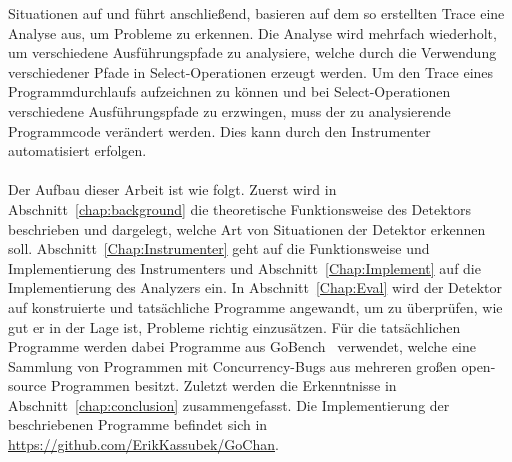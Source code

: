 Situationen auf und führt anschließend, basieren auf dem so erstellten Trace 
eine Analyse aus, um Probleme zu erkennen. Die Analyse wird mehrfach wiederholt, 
um verschiedene Ausführungspfade zu analysiere, welche durch die Verwendung 
verschiedener Pfade in Select-Operationen erzeugt werden. Um den Trace eines 
Programmdurchlaufs aufzeichnen zu können und bei Select-Operationen verschiedene 
Ausführungspfade zu erzwingen, muss der zu analysierende Programmcode 
verändert werden. Dies kann durch den Instrumenter automatisiert erfolgen.\\\\
Der Aufbau dieser Arbeit ist wie folgt. Zuerst wird in Abschnitt~\ref{chap:background}
die theoretische Funktionsweise des Detektors beschrieben und dargelegt, 
welche Art von Situationen der Detektor erkennen soll. 
Abschnitt~\ref{Chap:Instrumenter} geht auf die Funktionsweise und Implementierung 
des Instrumenters und Abschnitt~\ref{Chap:Implement} auf die Implementierung 
des Analyzers ein. In Abschnitt~\ref{Chap:Eval} wird der Detektor auf 
konstruierte und tatsächliche Programme angewandt, um zu überprüfen, 
wie gut er in der Lage ist, Probleme richtig einzusätzen. Für die 
tatsächlichen Programme werden dabei Programme aus GoBench~\cite{gobench}
verwendet, welche eine Sammlung von Programmen mit Concurrency-Bugs aus 
mehreren großen open-source Programmen besitzt. Zuletzt werden die 
Erkenntnisse in Abschnitt~\ref{chap:conclusion} zusammengefasst. Die Implementierung
der beschriebenen Programme befindet sich in \url{https://github.com/ErikKassubek/GoChan}.
